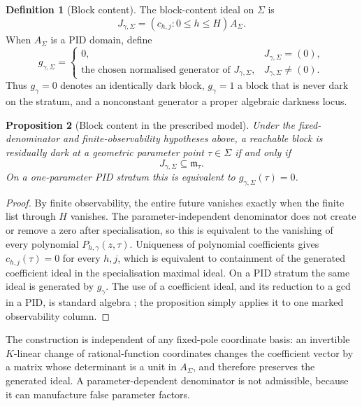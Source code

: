 \documentclass[11pt]{article}
\newtheorem{proposition}{Proposition}[section]
\theoremstyle{definition}
\newtheorem{definition}[proposition]{Definition}
\theoremstyle{remark}
\begin{document}
\begin{definition}[Block content]
The block-content ideal on $\Sigma$ is
\begin{equation}\label{eq:Jgamma}
J_{\gamma,\Sigma}
=(c_{h,j}:0\le h\le H)_{}A_\Sigma.
\end{equation}
When $A_\Sigma$ is a PID domain, define
\[
g_{\gamma,\Sigma}=
\begin{cases}
0,&J_{\gamma,\Sigma}=(0),\\
\text{the chosen normalised generator of }J_{\gamma,\Sigma},&J_{\gamma,\Sigma}\ne(0).
\end{cases}
\]
Thus $g_\gamma=0$ denotes an identically dark block, $g_\gamma=1$ a block that is never dark on the stratum, and a nonconstant generator a proper algebraic darkness locus.
\end{definition}

\begin{proposition}[Block content in the prescribed model]\label{prop:blockcontent}
Under the fixed-denominator and finite-observability hypotheses above, a reachable block is residually dark at a geometric parameter point $\tau\in\Sigma$ if and only if
\[
J_{\gamma,\Sigma}\subseteq\mathfrak m_\tau.
\]
On a one-parameter PID stratum this is equivalent to $g_{\gamma,\Sigma}(\tau)=0$.
\end{proposition}

\begin{proof}
By finite observability, the entire future vanishes exactly when the finite list through $H$ vanishes. The parameter-independent denominator does not create or remove a zero after specialisation, so this is equivalent to the vanishing of every polynomial $P_{h,\gamma}(z,\tau)$. Uniqueness of polynomial coefficients gives $c_{h,j}(\tau)=0$ for every $h,j$, which is equivalent to containment of the generated coefficient ideal in the specialisation maximal ideal. On a PID stratum the same ideal is generated by $g_\gamma$. The use of a coefficient ideal, and its reduction to a gcd in a PID, is standard algebra \parencite{StacksContent}; the proposition simply applies it to one marked observability column.
\end{proof}

The construction is independent of any fixed-pole coordinate basis: an invertible $K$-linear change of rational-function coordinates changes the coefficient vector by a matrix whose determinant is a unit in $A_\Sigma$, and therefore preserves the generated ideal. A parameter-dependent denominator is not admissible, because it can manufacture false parameter factors.
\end{document}

